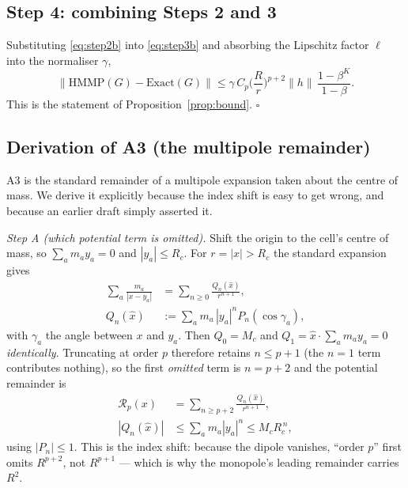 \subsection{Step 4: combining Steps 2 and 3}
Substituting \eqref{eq:step2b} into \eqref{eq:step3b} and absorbing the Lipschitz factor
$\ell$ into the normaliser $\gamma$,
\begin{equation}
\big\|\mathrm{HMMP}(G)-\mathrm{Exact}(G)\big\|
\le\gamma\,C_p\Big(\frac{R}{r}\Big)^{p+2}\|h\|\,\frac{1-\beta^K}{1-\beta}.
\label{eq:theorem}
\end{equation}
This is the statement of Proposition~\ref{prop:bound}. $\square$

\subsection{Derivation of A3 (the multipole remainder)}
\label{app:a3}
A3 is the standard remainder of a multipole expansion taken about the centre of mass. We
derive it explicitly because the index shift is easy to get wrong, and because an earlier
draft simply asserted it.

\emph{Step A (which potential term is omitted).} Shift the origin to the cell's centre of mass,
so $\sum_a m_a y_a=0$ and $|y_a|\le R_c$. For $r=|x|>R_c$ the standard expansion gives
\begin{equation}
\begin{aligned}
\sum_a \frac{m_a}{|x-y_a|}&=\sum_{n\ge 0}\frac{Q_n(\hat x)}{r^{n+1}},\\
Q_n(\hat x)&:=\sum_a m_a\,|y_a|^n P_n(\cos\gamma_a),
\end{aligned}
\end{equation}
with $\gamma_a$ the angle between $x$ and $y_a$. Then $Q_0=M_c$ and
$Q_1=\hat x\cdot\sum_a m_a y_a=0$ \emph{identically}. Truncating at order $p$ therefore retains
$n\le p+1$ (the $n=1$ term contributes nothing), so the first \emph{omitted} term is $n=p+2$
and the potential remainder is
\begin{equation}
\begin{aligned}
\mathcal R_p(x)&=\sum_{n\ge p+2}\frac{Q_n(\hat x)}{r^{n+1}},\\
|Q_n(\hat x)|&\le\sum_a m_a|y_a|^n\le M_c R_c^{\,n},
\end{aligned}
\end{equation}
using $|P_n|\le1$. This is the index shift: because the dipole vanishes, ``order $p$'' first
omits $R^{p+2}$, not $R^{p+1}$ --- which is why the monopole's leading remainder carries $R^2$.

